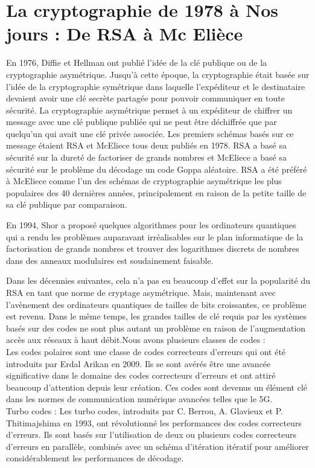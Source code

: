 \documentclass[12pt,openany]{report}
\begin{document}
\chapter{La cryptographie de 1978 à Nos jours  : De RSA à Mc Elièce}
\minitoc
\newpage

En 1976, Diffie et Hellman ont publié l'idée de la clé publique ou de la cryptographie asymétrique. Jusqu'à cette époque, la cryptographie était basée sur l'idée de la cryptographie symétrique dans laquelle l'expéditeur et le destinataire devaient avoir une clé secrète partagée pour pouvoir
 communiquer en toute sécurité. La cryptographie asymétrique permet à un expéditeur de chiffrer un
message avec une clé publique publiée qui ne peut être déchiffrée que par quelqu'un qui
avait une clé privée associée.
Les premiers schémas basés sur ce message étaient RSA
et McEliece  tous deux publiés en 1978. RSA a basé sa sécurité sur la dureté de
factoriser de grands nombres et McEliece a basé sa sécurité sur le problème du décodage
un code Goppa aléatoire.
RSA a été préféré à McEliece comme l'un des schémas de cryptographie asymétrique les plus populaires des 40 dernières années, principalement en raison de la petite taille de sa clé publique par
comparaison.
 
En 1994, Shor a proposé quelques algorithmes pour les ordinateurs quantiques qui
a rendu les problèmes auparavant irréalisables sur le plan informatique de la factorisation de grands nombres
et trouver des logarithmes discrets de nombres dans des anneaux modulaires est soudainement faisable.

 
Dans
les décennies suivantes, cela n'a pas eu beaucoup d'effet sur la popularité du RSA en tant que
norme de cryptage asymétrique. Mais, maintenant avec l'avènement des ordinateurs quantiques
de tailles de bits croissantes, ce problème est revenu. Dans le même temps, les grandes tailles de clé
requis par les systèmes basés sur des codes ne sont plus autant un problème en raison de l'augmentation
accès aux réseaux à haut débit.\hspace{0.2cm}Nous avons plusieurs classes de codes :\\
Les codes polaires sont une classe de codes correcteurs d'erreurs qui ont été introduits par Erdal Arikan en 2009. Ils se sont avérés être une avancée significative dans le domaine des codes correcteurs d'erreurs et ont attiré beaucoup d'attention depuis leur création. Ces codes sont devenus un élément clé dans les normes de communication numérique avancées telles que le 5G.\\
Turbo codes : Les turbo codes, introduits par C. Berrou, A. Glavieux et P. Thitimajshima en 1993, ont révolutionné les performances des codes correcteurs d'erreurs. Ils sont basés sur l'utilisation de deux ou plusieurs codes correcteurs d'erreurs en parallèle, combinés avec un schéma d'itération itératif pour améliorer considérablement les performances de décodage.
\end{document}
